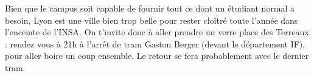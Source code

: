 Bien que le campus soit capable de fournir tout ce dont un étudiant normal a
besoin, Lyon est une ville bien trop belle pour rester cloîtré toute l'année dans
l'enceinte de l'INSA. On t'invite donc à aller prendre un verre place des
Terreaux : rendez vous à 21h à l'arrêt de tram Gaston Berger (devant le
département IF), pour aller boire un coup ensemble. Le retour se fera
probablement avec le dernier tram.
